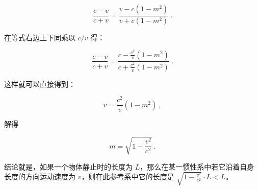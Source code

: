 \begin{equation}
\frac{c-v}{c+v}=\frac{v-c(1-m^2)}{v+c(1-m^2)}~.
\end{equation}

在等式右边上下同乘以 $c/v$ 得：

\begin{equation}
\frac{c-v}{c+v}=\frac{c-\frac{c^2}{v}(1-m^2)}{c+\frac{c^2}{v}(1-m^2)}~.
\end{equation}

这样就可以直接得到：

\begin{equation}
v=\frac{c^2}{v}(1-m^2)~,
\end{equation}

解得

\begin{equation}
m=\sqrt{1-\frac{v^2}{c^2}}~.
\end{equation}

结论就是，如果一个物体静止时的长度为 $L$，那么在某一惯性系中若它沿着自身长度的方向运动速度为 $v$，则在此参考系中它的长度是 $\sqrt{1-\frac{v^2}{c^2}}\cdot L<L$。






